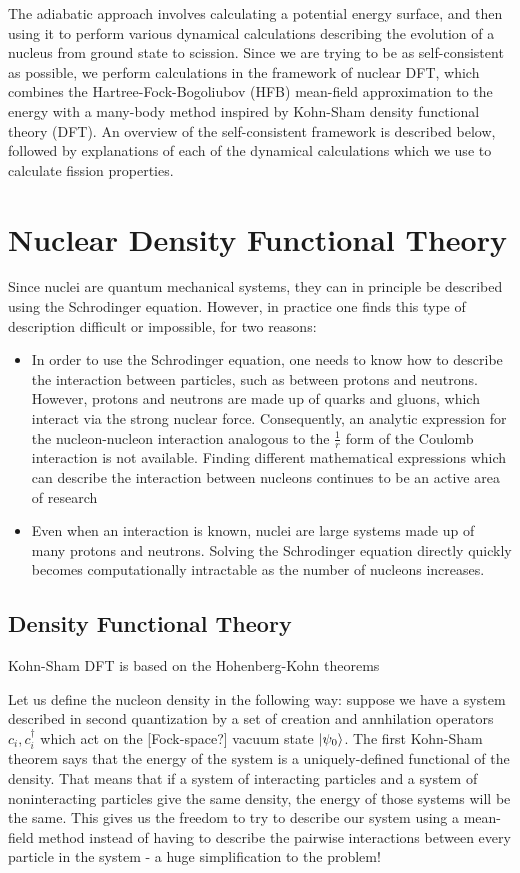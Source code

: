 The adiabatic approach involves calculating a potential energy surface, and then using it to perform various dynamical calculations describing the evolution of a nucleus from ground state to scission. Since we are trying to be as self-consistent as possible, we perform calculations in the framework of nuclear DFT, which combines the Hartree-Fock-Bogoliubov (HFB) mean-field approximation to the energy with a many-body method inspired by Kohn-Sham density functional theory (DFT). An overview of the self-consistent framework is described below, followed by explanations of each of the dynamical calculations which we use to calculate fission properties.

\section{Nuclear Density Functional Theory}
Since nuclei are quantum mechanical systems, they can in principle be described using the Schrodinger equation. However, in practice one finds this type of description difficult or impossible, for two reasons:

\begin{itemize}
\item In order to use the Schrodinger equation, one needs to know how to describe the interaction between particles, such as between protons and neutrons. However, protons and neutrons are made up of quarks and gluons, which interact via the strong nuclear force. Consequently, an analytic expression for the nucleon-nucleon interaction analogous to the $\frac{1}{r}$ form of the Coulomb interaction is not available. Finding different mathematical expressions which can describe the interaction between nucleons continues to be an active area of research \cite{lots of papers}
\item Even when an interaction is known, nuclei are large systems made up of many protons and neutrons. Solving the Schrodinger equation directly quickly becomes computationally intractable as the number of nucleons increases.
\end{itemize}

\subsection{Density Functional Theory}\label{sect:DFT}
Kohn-Sham DFT is based on the Hohenberg-Kohn theorems

Let us define the nucleon density in the following way: suppose we have a system described in second quantization by a set of creation and annhilation operators $c_i, c_i^\dagger$ which act on the [Fock-space?] vacuum state $\ket{\psi_0}$. The first Kohn-Sham theorem says that the energy of the system is a uniquely-defined functional of the density. That means that if a system of interacting particles and a system of noninteracting particles give the same density, the energy of those systems will be the same. This gives us the freedom to try to describe our system using a mean-field method instead of having to describe the pairwise interactions between every particle in the system - a huge simplification to the problem!

